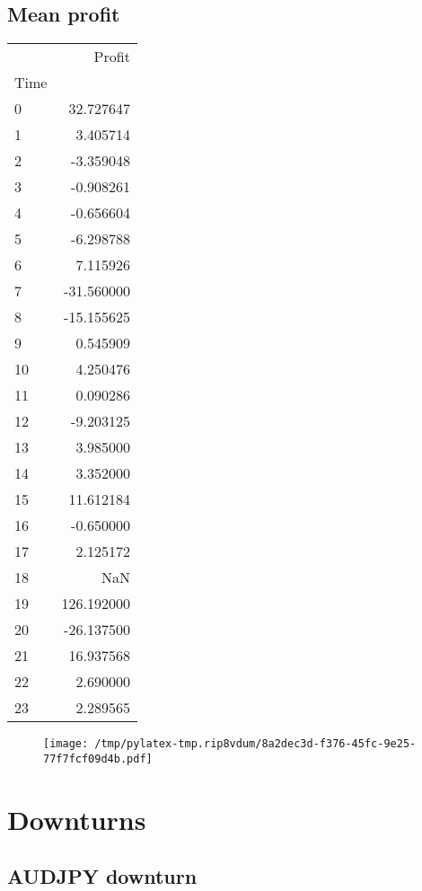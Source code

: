 \documentclass{article}%
\begin{document}
\subsection{Mean profit }%
\label{subsec:Meanprofit}%
\begin{tabular}{lr}
\toprule
{} &      Profit \\
Time &             \\
\midrule
0    &   32.727647 \\
1    &    3.405714 \\
2    &   -3.359048 \\
3    &   -0.908261 \\
4    &   -0.656604 \\
5    &   -6.298788 \\
6    &    7.115926 \\
7    &  -31.560000 \\
8    &  -15.155625 \\
9    &    0.545909 \\
10   &    4.250476 \\
11   &    0.090286 \\
12   &   -9.203125 \\
13   &    3.985000 \\
14   &    3.352000 \\
15   &   11.612184 \\
16   &   -0.650000 \\
17   &    2.125172 \\
18   &         NaN \\
19   &  126.192000 \\
20   &  -26.137500 \\
21   &   16.937568 \\
22   &    2.690000 \\
23   &    2.289565 \\
\bottomrule
\end{tabular}
%


\begin{figure}[htbp]%
\centering%
\texttt{[image: /tmp/pylatex-tmp.rip8vdum/8a2dec3d-f376-45fc-9e25-77f7fcf09d4b.pdf]}%
\end{figure}

%
\newpage %
\section{Downturns}%
\label{sec:Downturns}%
\subsection{AUDJPY downturn}%
\label{subsec:AUDJPYdownturn}%
\end{document}
